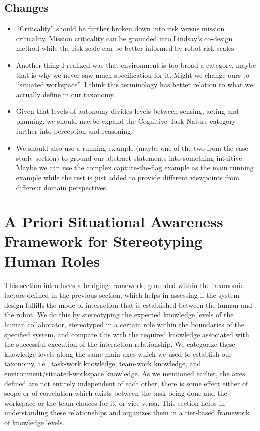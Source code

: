 \documentclass[letterpaper, 10 pt, conference]{ieeeconf} %
\begin{document}
\subsection{Changes}
\begin{itemize}{}
  \item ``Criticality'' should be further broken down into risk versus mission criticality. Mission
    criticality can be grounded into Lindsay's co-design method while the risk scale can be better
    informed by robot risk scales.
  \item Another thing I realized was that environment is too broad a category, maybe that is why we
    never saw much specification for it. Might we change ours to ``situated workspace''. I think
    this terminology has better relation to what we actually define in our taxonomy.
  \item Given that levels of autonomy divides levels between sensing, acting and planning, we should
    maybe expand the Cognitive Task Nature category further into perception and reasoning.
  \item We should also use a running example (maybe one of the two from the case-study section) to
    ground our abstract statements into something intuitive. Maybe we can use the complex
    capture-the-flag example as the main running example while the rest is just added to provide
    different viewpoints from different domain perspectives.
\end{itemize}

\section{A Priori Situational Awareness Framework for Stereotyping Human Roles}

This section introduces a bridging framework, grounded within the taxonomic factors defined in the
previous section, which helps in assessing if the system design fulfills the mode of interaction
that is established between the human and the robot. We do this by stereotyping the expected
knowledge levels of the human collaborator, stereotyped in a certain role within the boundaries of
the specified system, and compare this with the required knowledge associated with the successful
execution of the interaction relationship. We categorize these knowledge levels along the same main
axes which we used to establish our taxonomy, i.e., task-work knowledge, team-work knowledge, and
environment/situated-workspace knowledge. As we mentioned earlier, the axes defined are not entirely
independent of each other, there is some effect either of scope or of correlation which exists
between the task being done and the workspace or the team choices for it, or vice versa. This
section helps in understanding these relationships and organizes them in a tier-based framework of
knowledge levels.
\end{document}
